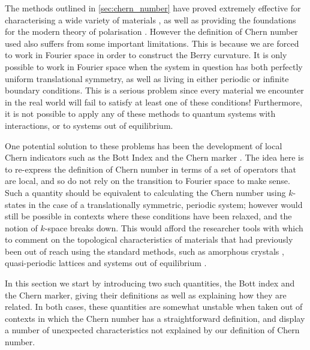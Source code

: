 
The methods outlined in \textsection \ref{sec:chern_number} have proved extremely effective for characterising a wide variety of materials \cite{haldane_model_1988}, as well as providing the foundations for the modern theory of polarisation \cite{resta_macroscopic_1999}. However the definition of Chern number used also suffers from some important limitations. This is because we are forced to work in Fourier space in order to construct the Berry curvature. It is only possible to work in Fourier space when the system in question has both perfectly uniform translational symmetry, as well as living in either periodic or infinite boundary conditions. This is a serious problem since every material we encounter in the real world will fail to satisfy at least one of these conditions! Furthermore, it is not possible to apply any of these methods to quantum systems with interactions, or to systems out of equilibrium.\par
One potential solution to these problems has been the development of local Chern indicators such as the Bott Index \cite{toniolo_equivalence_2017,loring_guide_2019} and the Chern marker \cite{bianco_mapping_2011}. The idea here is to re-express the definition of Chern number in terms of a set of operators that are local, and so do not rely on the transition to Fourier space to make sense. Such a quantity should be equivalent to calculating the Chern number using $ k$-states in the case of a translationally symmetric, periodic system; however would still be possible in contexts where these conditions have been relaxed, and the notion of $k$-space breaks down. This would afford the researcher tools with which to comment on the topological characteristics of materials that had previously been out of reach using the standard methods, such as amorphous crystals \cite{agarwala_topological_2017}, quasi-periodic lattices \cite{huang_theory_2018} and systems out of equilibrium \cite{caio_topological_2019,toniolo_time-dependent_2018}. \par
In this section we start by introducing two such quantities, the Bott index and the Chern marker, giving their definitions as well as explaining how they are related. In both cases, these quantities are somewhat unstable when taken out of contexts in which the Chern number has a straightforward definition, and display a number of unexpected characteristics not explained by our definition of Chern number. 

